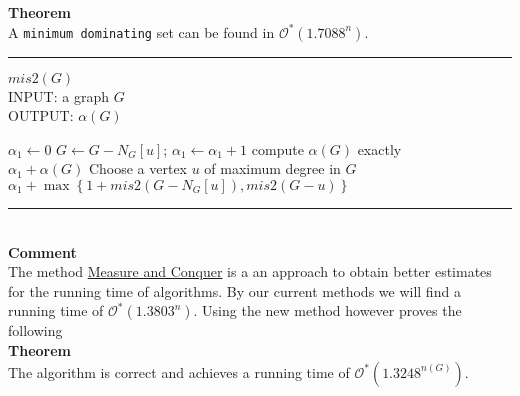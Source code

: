 \documentclass[a4paper, 12pt]{article}
\begin{document}
	\textbf{Theorem}\\
	A \texttt{minimum dominating} set can be found in $\mathcal{O}^*(1.7088^n)$.
	\par\noindent\rule{\textwidth}{0.4pt}
	\underline{$mis2(G)$}\\
	INPUT: a graph $G$\\
	OUTPUT: $\alpha(G)$
	\begin{algorithmic}[1]
		\State $\alpha_1 \gets 0$
		\State $G \gets G-N_G[u]$; $\alpha_1 \gets \alpha_1 + 1$
		\EndWhile
		\State compute $\alpha(G)$ exactly\\
		\indent\indent\Return $\alpha_1 + \alpha(G)$
		\EndIf
		\State Choose a vertex $u$ of maximum degree in $G$\\
		\Return $\alpha_1 + \max\left\{1 + mis2(G-N_G[u]), mis2(G-u)\right\}$
	\end{algorithmic}
	\par\noindent\rule{\textwidth}{0.4pt}\\
	\textbf{Comment}\\
	The method \underline{Measure and Conquer} is a an approach to obtain better estimates for the running time of algorithms. By our current methods we will find a running time of $\mathcal{O}^*(1.3803^n)$. Using the new method however proves the following\\
	\textbf{Theorem}\\
	The algorithm is correct and achieves a running time of $\mathcal{O}^*(1.3248^{n(G)})$.
\end{document}
